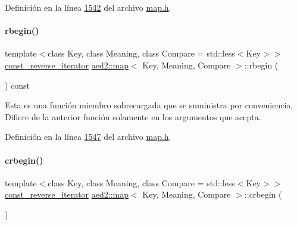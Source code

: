 Definición en la línea \hyperlink{map_8h_source_l01542}{1542} del archivo \hyperlink{map_8h_source}{map.\+h}.

\mbox{\label{classaed2_1_1map_a71ab53ab04f5e35a189c6576fddeb483_a71ab53ab04f5e35a189c6576fddeb483}} 
\paragraph{\texorpdfstring{rbegin()}{rbegin()}\hspace{0.1cm}{\footnotesize\ttfamily [2/2]}}
{\footnotesize\ttfamily template$<$class Key, class Meaning, class Compare = std\+::less$<$\+Key$>$$>$ \\
\hyperlink{classaed2_1_1map_aed66a216549d13078a3ea6978ea0b768_aed66a216549d13078a3ea6978ea0b768}{const\+\_\+reverse\+\_\+iterator} \hyperlink{classaed2_1_1map}{aed2\+::map}$<$ Key, Meaning, Compare $>$\+::rbegin (\begin{DoxyParamCaption}{ }\end{DoxyParamCaption}) const\hspace{0.3cm}{\ttfamily [inline]}}

Esta es una función miembro sobrecargada que se suministra por conveniencia. Difiere de la anterior función solamente en los argumentos que acepta. 

Definición en la línea \hyperlink{map_8h_source_l01547}{1547} del archivo \hyperlink{map_8h_source}{map.\+h}.

\mbox{\label{classaed2_1_1map_a6ad62765a2b2e00247b9e35a7542b448_a6ad62765a2b2e00247b9e35a7542b448}} 
\paragraph{\texorpdfstring{crbegin()}{crbegin()}}
{\footnotesize\ttfamily template$<$class Key, class Meaning, class Compare = std\+::less$<$\+Key$>$$>$ \\
\hyperlink{classaed2_1_1map_aed66a216549d13078a3ea6978ea0b768_aed66a216549d13078a3ea6978ea0b768}{const\+\_\+reverse\+\_\+iterator} \hyperlink{classaed2_1_1map}{aed2\+::map}$<$ Key, Meaning, Compare $>$\+::crbegin (\begin{DoxyParamCaption}{ }\end{DoxyParamCaption})\hspace{0.3cm}{\ttfamily [inline]}}

